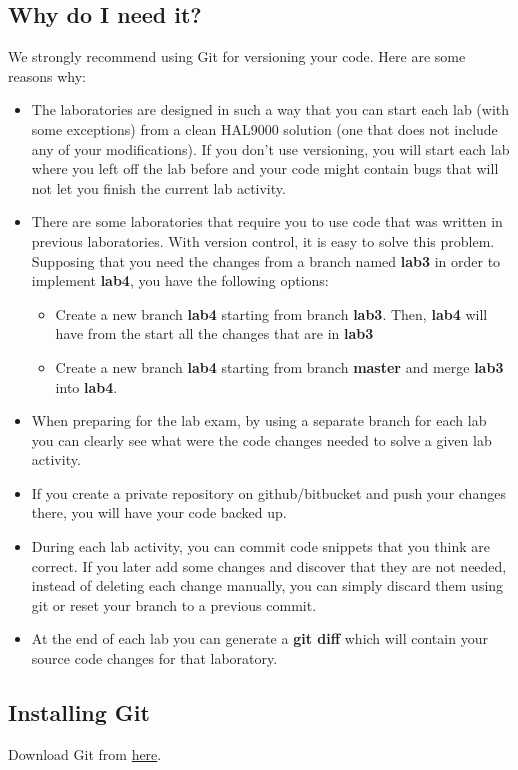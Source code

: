 \begin{appendices}
\subsection{Why do I need it?}
We strongly recommend using Git for versioning your code.
Here are some reasons why:
\begin{itemize}
	\item The laboratories are designed in such a way that you can start each lab (with some exceptions) from a clean HAL9000 solution (one that does not include any of your modifications). 
		 If you don't use versioning, you will start each lab where you left off the lab before and your code might contain bugs that will not let you finish the current lab activity.
        \item There are some laboratories that require you to use code that was written in previous laboratories. 
                With version control, it is easy to solve this problem. Supposing that you need the changes from a branch named \textbf{lab3} in order to implement \textbf{lab4}, you have the following options:
		\begin{itemize}
			\item Create a new branch \textbf{lab4} starting from branch \textbf{lab3}. Then, \textbf{lab4} will have from the start all the changes that are in \textbf{lab3}
			\item Create a new branch \textbf{lab4} starting from branch \textbf{master} and merge \textbf{lab3} into \textbf{lab4}.
		\end{itemize}
	\item When preparing for the lab exam, by using a separate branch for each lab you can clearly see what were the code changes needed to solve a given lab activity.
	\item If you create a private repository on github/bitbucket and push your changes there, you will have your code backed up.
	\item During each lab activity, you can commit code snippets that you think are correct. If you later add some changes and discover that they are not needed, instead of deleting each change manually, you can simply discard them using git or reset your branch to a previous commit.
	\item At the end of each lab you can generate a \textbf{git diff} which will contain your source code changes for that laboratory.
\end{itemize}

\FloatBarrier
\subsection{Installing Git}
Download Git from \href{https://git-scm.com/download/win}{here}.


\end{appendices}
